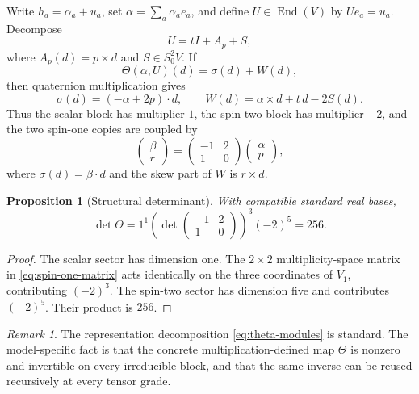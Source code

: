 \documentclass[11pt]{article}
\newtheorem{proposition}[theorem]{Proposition}
\theoremstyle{definition}
\theoremstyle{remark}
\newtheorem{remark}[theorem]{Remark}
\begin{document}
Write $h_a=\alpha_a+u_a$, set $\alpha=\sum_a\alpha_ae_a$, and define $U\in\operatorname{End}(V)$ by $Ue_a=u_a$.  Decompose
\[
  U=tI+A_p+S,
\]
where $A_p(d)=p\times d$ and $S\in S^2_0V$.  If
\[
  \Theta(\alpha,U)(d)=\sigma(d)+W(d),
\]
then quaternion multiplication gives
\begin{equation}\label{eq:theta-block-formulas}
  \sigma(d)=(-\alpha+2p)\cdot d,
  \qquad
  W(d)=\alpha\times d+t\,d-2S(d).
\end{equation}
Thus the scalar block has multiplier $1$, the spin-two block has multiplier $-2$, and the two spin-one copies are coupled by
\begin{equation}\label{eq:spin-one-matrix}
  \begin{pmatrix}\beta\\ r\end{pmatrix}
  =
  \begin{pmatrix}-1&2\\1&0\end{pmatrix}
  \begin{pmatrix}\alpha\\p\end{pmatrix},
\end{equation}
where $\sigma(d)=\beta\cdot d$ and the skew part of $W$ is $r\times d$.

\begin{proposition}[Structural determinant]\label{prop:det-theta}
With compatible standard real bases,
\[
  \det\Theta
  =1^1\left(\det\begin{pmatrix}-1&2\\1&0\end{pmatrix}\right)^3(-2)^5
  =256.
\]
\end{proposition}

\begin{proof}
The scalar sector has dimension one.  The $2\times2$ multiplicity-space matrix in \eqref{eq:spin-one-matrix} acts identically on the three coordinates of $V_1$, contributing $(-2)^3$.  The spin-two sector has dimension five and contributes $(-2)^5$.  Their product is $256$.
\end{proof}

\begin{remark}
The representation decomposition \eqref{eq:theta-modules} is standard.  The model-specific fact is that the concrete multiplication-defined map $\Theta$ is nonzero and invertible on every irreducible block, and that the same inverse can be reused recursively at every tensor grade.
\end{remark}
\end{document}
